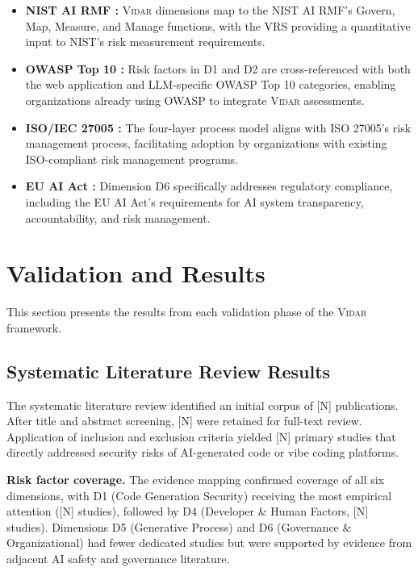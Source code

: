 \documentclass[preprint,review,12pt]{elsarticle}
\newcommand{\vidar}{\textsc{Vidar}}
\begin{document}
\begin{itemize}
    \item \textbf{NIST AI RMF \cite{nist2023ai}:} \vidar{} dimensions map to the NIST AI RMF's Govern, Map, Measure, and Manage functions, with the VRS providing a quantitative input to NIST's risk measurement requirements.
    \item \textbf{OWASP Top 10 \cite{owasp2021top10, owasp2025llm}:} Risk factors in D1 and D2 are cross-referenced with both the web application and LLM-specific OWASP Top 10 categories, enabling organizations already using OWASP to integrate \vidar{} assessments.
    \item \textbf{ISO/IEC 27005 \cite{iso27005}:} The four-layer process model aligns with ISO 27005's risk management process, facilitating adoption by organizations with existing ISO-compliant risk management programs.
    \item \textbf{EU AI Act \cite{euaiact2024}:} Dimension D6 specifically addresses regulatory compliance, including the EU AI Act's requirements for AI system transparency, accountability, and risk management.
\end{itemize}


\section{Validation and Results}
\label{sec:validation}

This section presents the results from each validation phase of the \vidar{} framework.

\subsection{Systematic Literature Review Results}
\label{subsec:slr_results}

The systematic literature review identified an initial corpus of [N] publications. After title and abstract screening, [N] were retained for full-text review. Application of inclusion and exclusion criteria yielded [N] primary studies that directly addressed security risks of AI-generated code or vibe coding platforms.

\textbf{Risk factor coverage.} The evidence mapping confirmed coverage of all six dimensions, with D1 (Code Generation Security) receiving the most empirical attention ([N] studies), followed by D4 (Developer \& Human Factors, [N] studies). Dimensions D5 (Generative Process) and D6 (Governance \& Organizational) had fewer dedicated studies but were supported by evidence from adjacent AI safety and governance literature.
\end{document}
